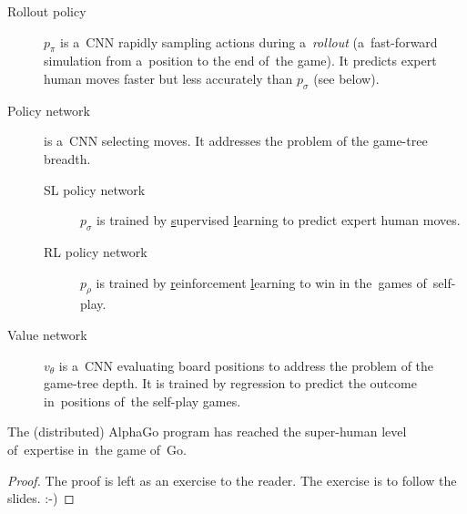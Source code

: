 \documentclass[a4paper,10pt]{article}
\begin{document}
\begin{description}
  \item [Rollout policy] $p_\pi$ is a~CNN rapidly sampling actions during a~\emph{rollout} (a~fast-forward simulation from a~position to the end of~the game).
    It predicts expert human moves faster but less accurately than $p_\sigma$ (see below).

  \item [Policy network] is a~CNN selecting moves.
    It addresses the problem of the game-tree breadth.
    \begin{description}
      \item [SL policy network] $p_\sigma$ is trained by \underline{s}upervised \underline{l}earning to predict expert human moves.
        \item [RL policy network] $p_\rho$ is trained by \underline{r}einforcement \underline{l}earning to win in the~games of~self-play.
    \end{description}

  \item [Value network] $v_\theta$ is a~CNN evaluating board positions to address the problem of the game-tree depth.
    It is trained by regression to predict the outcome in~positions of~the self-play games.
\end{description}

\begin{theorem}
  The (distributed) AlphaGo program has reached the super-human level of~expertise in~the game of~Go.
\end{theorem}

\begin{proof}
  The proof is left as an exercise to the reader.
  The exercise is to follow the slides.
  :-)
\end{proof}
\end{document}
